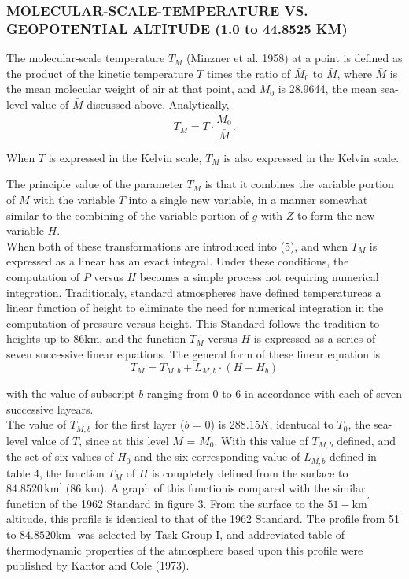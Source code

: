 \documentclass{article}
\begin{document}
\subsubsection{MOLECULAR-SCALE-TEMPERATURE VS. GEOPOTENTIAL ALTITUDE (1.0 to 44.8525 KM)}

The molecular-scale temperature $T_M$ (Minzner et al. 1958) at a point is defined as the product of the kinetic temperature $T$ times the ratio of $\bar{M}_0$ to $\bar{M}$, where $\bar{M}$ is the mean molecular weight of air at that point, and $\bar{M}_0$ is 28.9644, the mean sea-level value of $\bar{M}$ discussed above. Analytically,
\begin{equation}
  T_M = T \cdot \frac{\bar{M}_0}{\bar{M}}. \tag{22}
\end{equation}

When $T$ is expressed in the Kelvin scale, $T_M$ is also expressed in the Kelvin scale.

The principle value of the parameter $T_M$ is that it combines the variable portion of $M$ with the variable $T$ into a single new variable, in a manner somewhat similar to the combining of the variable portion of $g$ with $Z$ to form the new variable $H$.\\
When both of these transformations are introduced into (5), and when $T_M$ is expressed as a linear has an exact integral. Under these conditions, the computation of $P$ versus $H$ becomes a simple process not requiring numerical integration. Traditionaly, standard atmospheres have defined temperatureas a linear function of height to eliminate the need for numerical integration in the computation of pressure versus height. This Standard follows the tradition to heights up to 86km, and the function $T_M$ versus $H$ is expressed as a series of seven successive linear equations. The general form of these linear equation is 
\begin{equation}
  T_M = T_{M,b} + L_{M,b}\cdot (H - H_b) 
  \tag{23}
\end{equation}

with the value of subscript $b$ ranging from 0 to 6 in accordance with each of seven successive layears.\\
The value of $T_{M,b}$ for the first layer ($b$ = 0) is 288.15$K$, identucal to $T_0$, the sea-level value of $T$, since at this level $M$ = $M_0$. With this value of $T_{M,b}$ defined, and the set of six values of $H_0$ and the six corresponding value of $L_{M,b}$ defined in table 4, the function $T_M$ of $H$ is completely defined from the surface to $84.8520 \, \text{km}^{\prime}$ (86 km). A graph of this functionis compared with the similar function of the 1962 Standard in figure 3. From the surface to the $51-\text{km}^\prime$ altitude, this profile is identical to that of the 1962 Standard. The profile from 51 to $84.8520 \text{km}^\prime$ was selected by Task Group I, and addreviated table of thermodynamic properties of the atmosphere based upon this profile were published by Kantor and Cole (1973).
\end{document}
